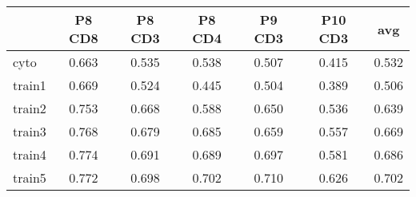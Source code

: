 \documentclass{article}
\begin{document}
\begin{tabular}{lcccccc}
   \hline  &P8 CD8& P8 CD3& P8 CD4& P9 CD3& P10 CD3& avg\\ 
\hline
cyto & 0.663 & 0.535 & 0.538 & 0.507 & 0.415 & 0.532 \\ 
  train1 & 0.669 & 0.524 & 0.445 & 0.504 & 0.389 & 0.506 \\ 
  train2 & 0.753 & 0.668 & 0.588 & 0.650 & 0.536 & 0.639 \\ 
  train3 & 0.768 & 0.679 & 0.685 & 0.659 & 0.557 & 0.669 \\ 
  train4 & 0.774 & 0.691 & 0.689 & 0.697 & 0.581 & 0.686 \\ 
  train5 & 0.772 & 0.698 & 0.702 & 0.710 & 0.626 & 0.702 \\ 
   \hline
\end{tabular}
\end{document}
